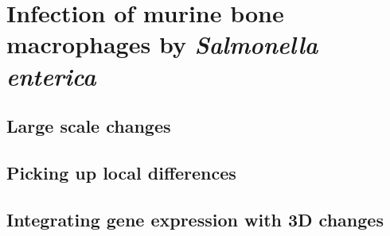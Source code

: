 \textsc{}%

\chapter{Infection of murine bone macrophages by \textit{Salmonella enterica}} %

\label{ch:02-03} %


\section{Large scale changes}

\section{Picking up local differences}

\section{Integrating gene expression with 3D changes}

\blindtext